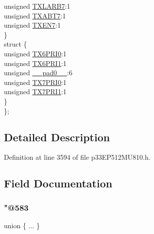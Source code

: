 \begin{DoxyCompactItemize}
\begin{tabbing}
\>\>unsigned \hyperlink{structtag_c1_t_r67_c_o_n_b_i_t_s_ac0204741553c3d09de799bfeb91cda28}{TXLARB7}:1\\
\>\>unsigned \hyperlink{structtag_c1_t_r67_c_o_n_b_i_t_s_adcff2b634fd77e2d9b794e24ef3ebf8f}{TXABT7}:1\\
\>\>unsigned \hyperlink{structtag_c1_t_r67_c_o_n_b_i_t_s_ad0ef0beedd94db4b5c0468da4c39b425}{TXEN7}:1\\
\>\} \\
\>struct \{\\
\>\>unsigned \hyperlink{structtag_c1_t_r67_c_o_n_b_i_t_s_afe2e8441e034e2d5689b82598e8d691e}{TX6PRI0}:1\\
\>\>unsigned \hyperlink{structtag_c1_t_r67_c_o_n_b_i_t_s_a529fa0e32de73bcf92a5fea3a931987f}{TX6PRI1}:1\\
\>\>unsigned \hyperlink{structtag_c1_t_r67_c_o_n_b_i_t_s_adf71f3d8410c1f1dbbc96680a92c49af}{\_\_pad0\_\_}:6\\
\>\>unsigned \hyperlink{structtag_c1_t_r67_c_o_n_b_i_t_s_a49e2a7c9ab7892910cf537cc4f236cdb}{TX7PRI0}:1\\
\>\>unsigned \hyperlink{structtag_c1_t_r67_c_o_n_b_i_t_s_a8ff1d2ac45265f631ac12645e6051900}{TX7PRI1}:1\\
\>\} \\
\}; \\

\end{tabbing}\end{DoxyCompactItemize}


\subsection{Detailed Description}


Definition at line 3594 of file p33\+E\+P512\+M\+U810.\+h.



\subsection{Field Documentation}
\mbox{\label{structtag_c1_t_r67_c_o_n_b_i_t_s_a6f8e855b32989ff6801276c8730d7363}} 
\subsubsection{\texorpdfstring{"@583}{@583}}
{\footnotesize\ttfamily union \{ ... \} }

\mbox{\label{structtag_c1_t_r67_c_o_n_b_i_t_s_adf71f3d8410c1f1dbbc96680a92c49af}} 
